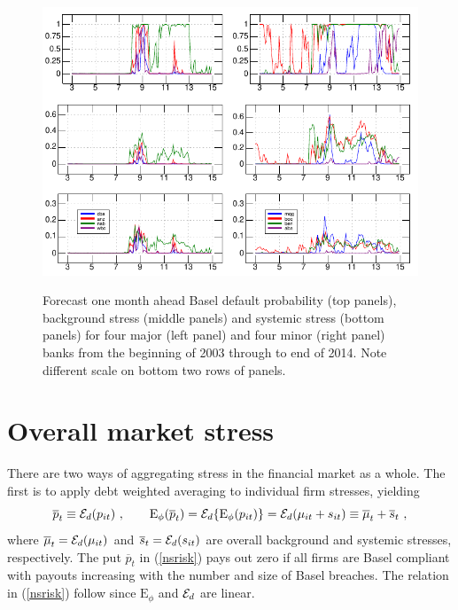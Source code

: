 \documentclass[authoryear]{elsarticle}
\newcommand{\E}{\mathrm{E}}
\newcommand{\Ex}{{\cal E}}
\newcommand{\Exd}{\Ex_d}
\newcommand{\Es}{\E_\phi}
\newcommand{\eref}[1]{(\ref{#1})}
\newcommand{\cq}{\ , \qquad}
\newcommand{\be}[1]{\begin{equation}\label{#1}}
\newcommand{\ee}{\end{equation}}
\begin{document}
 \begin{figure}[htbp]
\begin{center}
\label{default}
\includegraphics{figures/default.pdf}
\caption{Forecast one month ahead  Basel default probability (top panels), background stress (middle panels) and systemic stress (bottom panels) for  four major (left panel) and four minor (right panel)  banks from the beginning of 2003 through to end of 2014.  Note different scale on bottom two rows of panels.}
\end{center}
\end{figure}


\section{Overall market stress}\label{aggregate}


There are two ways of aggregating stress in the financial market as a whole.  The first is to apply debt weighted averaging to individual firm stresses, yielding
\be{nsrisk}
\overline p_t \equiv \Exd(p_{it}) \cq \Es(\overline p_t)=\Exd\{\Es(p_{it})\} = \Exd(\mu_{it}+s_{it}) \equiv \overline\mu_{t}+\overline s_t \ ,
\ee
where $\overline\mu_{t}=\Exd(\mu_{it})$ and $\overline s_{t}=\Exd(s_{it})$ are overall background and systemic stresses, respectively. The put $\overline p_t$ in \eref{nsrisk} pays out zero if all firms are Basel compliant with payouts increasing with the number and size of Basel breaches. The relation in \eref{nsrisk} follow since  $\Es$ and $\Exd$ are linear.
\end{document}
